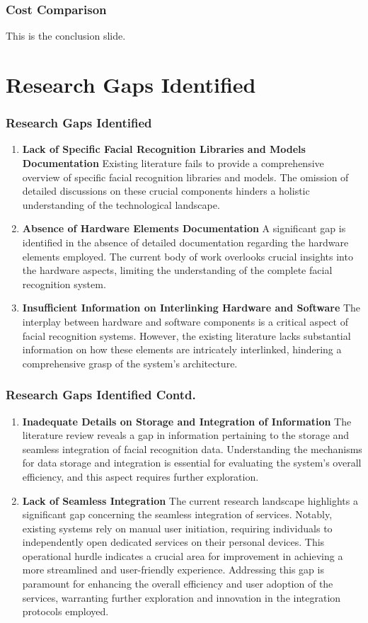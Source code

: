 \documentclass[aspectratio=169]{beamer}
\begin{document}
\begin{frame}
  \frametitle{Cost Comparison}
  This is the conclusion slide.
\end{frame}

\section{Research Gaps Identified}
\begin{frame}
  \frametitle{Research Gaps Identified}
  \begin{enumerate}
    \item \textbf{Lack of Specific Facial Recognition Libraries and Models Documentation}
    Existing literature fails to provide a comprehensive overview of specific facial recognition libraries and models. The omission of detailed discussions on these crucial components hinders a holistic understanding of the technological landscape.
    \item \textbf{Absence of Hardware Elements Documentation}
    A significant gap is identified in the absence of detailed documentation regarding the hardware elements employed. The current body of work overlooks crucial insights into the hardware aspects, limiting the understanding of the complete facial recognition system.
    \item \textbf{Insufficient Information on Interlinking Hardware and Software}
    The interplay between hardware and software components is a critical aspect of facial recognition systems. However, the existing literature lacks substantial information on how these elements are intricately interlinked, hindering a comprehensive grasp of the system's architecture.
  \end{enumerate}
\end{frame}

\begin{frame}
  \frametitle{Research Gaps Identified Contd.}
  \begin{enumerate}
    \item \textbf{Inadequate Details on Storage and Integration of Information}
    The literature review reveals a gap in information pertaining to the storage and seamless integration of facial recognition data. Understanding the mechanisms for data storage and integration is essential for evaluating the system's overall efficiency, and this aspect requires further exploration.
    \item \textbf{Lack of Seamless Integration}
    The current research landscape highlights a significant gap concerning the seamless integration of services. Notably, existing systems rely on manual user initiation, requiring individuals to independently open dedicated services on their personal devices. This operational hurdle indicates a crucial area for improvement in achieving a more streamlined and user-friendly experience. Addressing this gap is paramount for enhancing the overall efficiency and user adoption of the services, warranting further exploration and innovation in the integration protocols employed.    
  \end{enumerate}
\end{frame}
\end{document}
